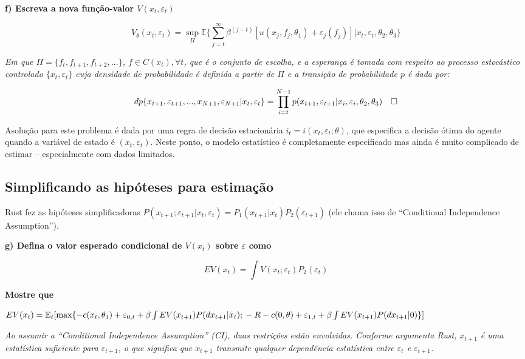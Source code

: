 \documentclass[12pt,a4paper]{article}
\begin{document}
\textbf{f) Escreva a nova função-valor \(V(x_t,\varepsilon_t)\)}

\[
V_\theta (x_t,\varepsilon_t) = \sup_\Pi \mathbb{E}\Bigg\{\sum_{j=t}^\infty \beta^{(j-t)}[u(x_j,f_j,\theta_1) + \varepsilon_j(f_j)]|x_t,\varepsilon_t,\theta_2,\theta_3 \Bigg\}
\]

\emph{Em que \(\Pi = \{f_t,f_{t+1},f_{t+2},...\}\),
\(f \in C(x_t), \forall t\), que é o conjunto de escolha, e a esperança
é tomada com respeito ao processo estocástico controlado
\(\{x_t,\varepsilon_t\}\) cuja densidade de probabilidade é definida a
partir de \(\Pi\) e a transição de probabilidade \(p\) é dada por:}

\[
dp\{x_{t+1},\varepsilon_{t+1},...,x_{N+1},\varepsilon_{N+1}|x_t,\varepsilon_t\} \\ = \prod_{i=t}^{N-1}p(x_{t+1},\varepsilon_{t+1}|x_{i},\varepsilon_{i},\theta_2,\theta_3) \quad \square
\]

Asolução para este problema é dada por uma regra de decisão estacionária
\(i_t = i(x_t,\varepsilon_t;\theta)\), que especifica a decisão ótima do
agente quando a variável de estado é \((x_t, \varepsilon_t)\). Neste
ponto, o modelo estatístico é completamente especificado mas ainda é
muito complicado de estimar -- especialmente com dados limitados.

\hypertarget{simplificando-as-hipoteses-para-estimacao}{%
\subsection{Simplificando as hipóteses para
estimação}\label{simplificando-as-hipoteses-para-estimacao}}

Rust fez as hipóteses simplificadoras
\(P (x_{t+1}; \varepsilon_{t+1}| x_t, \varepsilon_t) = P_1 ( x_{t+1}| x_t)P_2(\varepsilon_{t+1})\)
(ele chama isso de ``Conditional Independence Assumption'').

\textbf{g) Defina o valor esperado condicional de \(V(x_t)\) sobre
\(\varepsilon\) como}

\textbf{\[EV(x_t)= \int V(x_t;\varepsilon_t)P_2(\varepsilon_t)\]}

\textbf{Mostre que}

\(EV(x_t)=\mathbb{E}_t[\text{max}\{-c(x_t,\theta_1)+\varepsilon_{0,t} + \beta \int EV(x_{t+1})P(dx_{t+1}|x_t); \\ -R -c(0,\theta) + \varepsilon_{1,t} + \beta \int EV(x_{t+1})P(dx_{t+1}|0)\}]\)

\emph{Ao assumir a ``Conditional Independence Assumption'' (CI), duas
restrições estão envolvidas. Conforme argumenta Rust, \(x_{t+1}\) é uma
estatística suficiente para \(\varepsilon_{t+1}\), o que significa que
\(x_{t+1}\) transmite qualquer dependência estatística entre
\(\varepsilon_{t}\) e \(\varepsilon_{t+1}\).}
\end{document}
